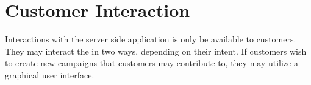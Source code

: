 
\section{Customer Interaction}


Interactions with the server side application is only be available to customers. They may interact the in two ways, depending on their intent. If customers wish to create new campaigns that customers may contribute to, they may utilize a graphical user interface. 

